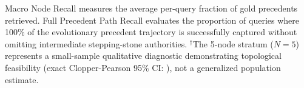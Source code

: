 \begin{table}[!t]
Macro Node Recall measures the average per-query fraction of gold precedents retrieved. Full Precedent Path Recall evaluates the proportion of queries where 100\% of the evolutionary precedent trajectory is successfully captured without omitting intermediate stepping-stone authorities.
$^\dagger$The 5-node stratum ($N=5$) represents a small-sample qualitative diagnostic demonstrating topological feasibility (exact Clopper-Pearson 95\% CI: \CatBFiveNodeClopperPearsonCI), not a generalized population estimate.
\end{table}
